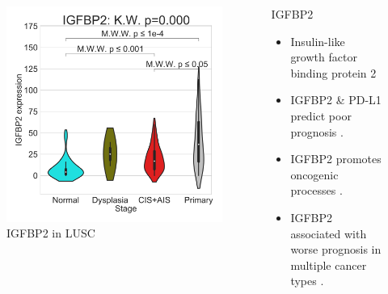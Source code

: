 \documentclass{beamer}
\begin{document}
\begin{frame}[allowframebreaks]
                    \begin{columns}
                        \begin{column}{0.4 \textwidth}
                            \begin{figure}
                                \includegraphics[width=\linewidth]{figures/DEG/Violin/STAR.TPM.SQC.senescence/IGFBP2.pdf}
                                \caption{IGFBP2 in LUSC}
                            \end{figure}
                        \end{column}
                        \begin{column}{0.55 \textwidth}
                            \begin{block}{IGFBP2}
                                \begin{itemize}
                                    \item Insulin-like growth factor binding protein 2
                                    \item IGFBP2 \& PD-L1 predict poor prognosis \cite{IGFBP2-01}.
                                    \item IGFBP2 promotes oncogenic processes \cite{IGFBP2-02}.
                                    \item IGFBP2 associated with worse prognosis in multiple cancer types \cite{IGFBP2-03}.
                                \end{itemize}
                            \end{block}
                        \end{column}
                    \end{columns}


\end{frame}
\end{document}
